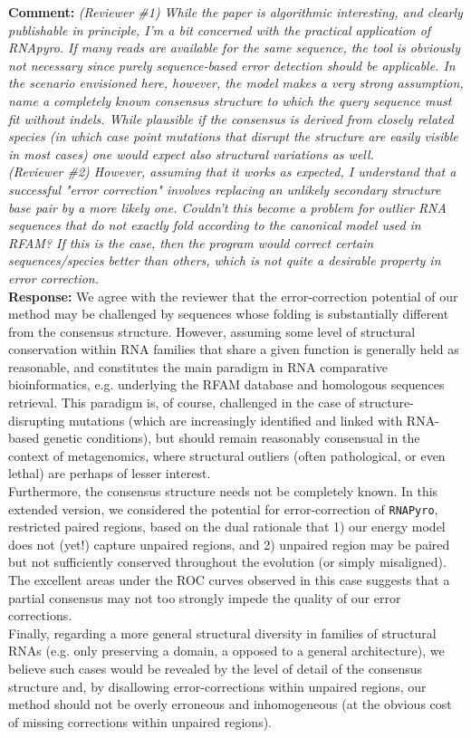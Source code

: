 \documentclass[11pt,hyperref,draft]{article} %
\newcommand{\Answer}[1]{\noindent\textsf{\textbf{Response: }}{\sf#1}\\}
\newcommand{\Comment}[1]{\noindent\textsf{\textbf{Comment: }}{\it#1}\\[.5em]}
\begin{document}
\Comment{(Reviewer \#1) While the paper is algorithmic interesting, and clearly publishable in principle, I'm a bit concerned with the practical application of RNApyro. If many reads are available for the same sequence, the tool is obviously not necessary since purely sequence-based error detection should be applicable. In the scenario envisioned here, however, the model makes a very strong assumption, name a completely known consensus structure to which the query sequence must fit without indels. While plausible if the consensus is derived from closely related species (in which case point mutations that disrupt the structure are easily visible in most cases) one would expect also structural variations as well.\\
(Reviewer \#2) However, assuming that it works as expected, I understand that a successful "error correction" involves replacing an unlikely secondary structure base pair by a more likely one. Couldn't this become a problem for outlier RNA sequences that do not exactly fold according to the canonical model used in RFAM? If this is the case, then the program would correct certain sequences/species better than others, which is not quite a desirable property in error correction. 
}
\Answer{We agree with the reviewer that the error-correction potential of our method may be challenged by sequences whose folding is substantially different from the consensus structure. However, assuming some level of structural conservation within RNA families that share a given function is generally held as reasonable, and constitutes the main paradigm in RNA comparative bioinformatics, e.g. underlying the RFAM database and homologous sequences retrieval. This paradigm is, of course, challenged in the case of structure-disrupting mutations (which are increasingly identified and linked with RNA-based genetic conditions), but should remain reasonably consensual in the context of metagenomics, where structural outliers (often pathological, or even lethal) are perhaps of lesser interest. \\
Furthermore, the consensus structure needs not be completely known. In this extended version, we considered the potential for error-correction of {\tt RNAPyro}, restricted paired regions, based on the dual rationale that 1) our energy model does not (yet!) capture unpaired regions, and 2) unpaired region may be paired but not sufficiently conserved throughout the evolution (or simply misaligned). The excellent areas under the ROC curves observed in this case suggests that a partial consensus may not too strongly impede the quality of our error corrections. \\
Finally, regarding a more general structural diversity in families of structural RNAs (e.g. only preserving a domain, a opposed to a general architecture), we believe such cases would be revealed by the level of detail of the consensus structure and, by disallowing error-corrections within unpaired regions, our method should not be overly erroneous and inhomogeneous (at the obvious cost of missing corrections within unpaired regions). }
\end{document}
